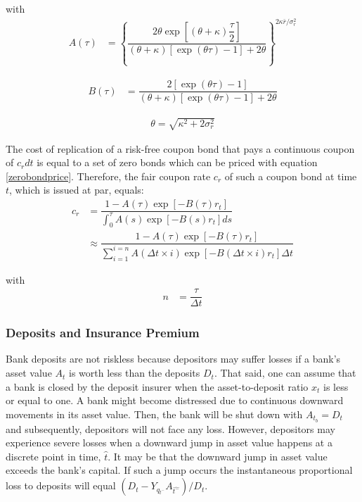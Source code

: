 with
\begin{align}
A\left( \tau \right) &= \left\{ \dfrac{2\theta \exp{\left[ \left(\theta + \kappa \right) \dfrac{\tau}{2}\right] } }{ \left( \theta + \kappa \right) \left[ \exp\left( \theta \tau \right) - 1 \right] +2 \theta} \right\}^{2 \kappa \bar{r} / \sigma_r^2 }\nonumber
\end{align}

\begin{align}
B\left(\tau \right) &= \dfrac{2 \left[ \exp\left( \theta \tau \right) -1 \right]}{\left( \theta + \kappa \right) \left[ \exp\left( \theta \tau \right) -1 \right] +2\theta } \nonumber
\end{align}

\begin{align}
\theta = \sqrt{\kappa^2 + 2 \sigma_r^2}\nonumber
\end{align}

The cost of replication of a risk-free coupon bond that pays a continuous coupon of $c_r dt$ is equal to a set of zero bonds which can be priced with equation \ref{zerobondprice}. Therefore, the fair coupon rate $c_r $ of such a coupon bond at time $t$, which is issued at par, equals:
\begin{align}
c_r &= \dfrac{1-A\left( \tau \right) \exp\left[ - B\left( \tau \right) r_t \right]}{\int_0^{\tau} A \left( s \right) \exp\left[ -B\left(s\right) r_t \right] ds}\nonumber \\
&\approx \dfrac{1- A\left( \tau \right)\exp\left[ -B \left( \tau \right) r_t \right]}{\sum_{i=1}^{i=n} A\left( \Delta t \times i \right) \exp\left[ -B \left( \Delta t \times i \right) r_t \right] \Delta t}
\end{align}

with
\begin{align}
n &= \dfrac{\tau}{\Delta t}
\end{align}

\subsubsection*{Deposits and Insurance Premium}
Bank deposits are not riskless because depositors may suffer losses if a bank's asset value $A_t$ is worth less than the deposits $D_t$. That said, one can assume that a bank is closed by the deposit insurer when the asset-to-deposit ratio $x_t$ is less or equal to one. A bank might become distressed due to continuous downward movements in its asset value. Then, the bank will be shut down with $A_{t_{b}}=D_t$ and subsequently, depositors will not face any loss. However, depositors may experience severe losses when a downward jump in asset value happens at a discrete point in time, $\hat{t}$. It may be that the downward jump in asset value exceeds the bank's capital. If such a jump occurs the instantaneous proportional loss to deposits will equal $\left(D_t - Y_{q_{t^{-}}} A_{\hat{t^{-}}}  \right) / D_t$.\\

